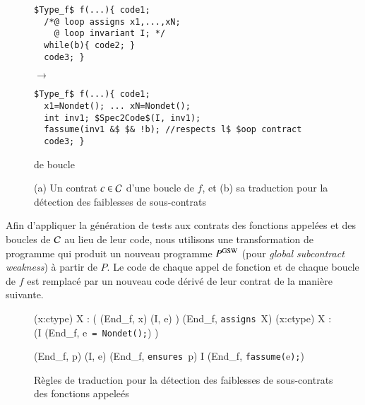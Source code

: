 \begin{figure*}[tb]
\begin{center}
\begin{minipage}{0.35\columnwidth}
\begin{lstlisting}[mathescape]
$Type_f$ f(...){ code1;
  /*@ loop assigns x1,...,xN;
    @ loop invariant I; */
  while(b){ code2; }
  code3; }
\end{lstlisting}
\end{minipage}
\hspace{-6mm}
\begin{minipage}{0.07\columnwidth}$\to$\end{minipage}
\begin{minipage}{0.55\columnwidth}
\begin{lstlisting}[mathescape]
$Type_f$ f(...){ code1;
  x1=Nondet(); ... xN=Nondet();
  int inv1; $Spec2Code$(I, inv1);
  fassume(inv1 &$ $& !b); //respects l$ $oop contract
  code3; }
\end{lstlisting}
\end{minipage}
\vspace{-3mm}
\caption{(a) Un contrat $c\in{\ensuremath\mathcal{C}}$ d'une boucle de $f$, et
(b) sa traduction pour la détection des faiblesses de sous-contrats} de boucle
\vspace{-3mm}
\label{fig:CW-transf-loops}
\end{center}
\end{figure*}

Afin d'appliquer la génération de tests aux contrats des fonctions appelées et
des boucles de ${\mathcal{C}}$ au lieu de leur code, nous utilisons une transformation de
programme qui produit un nouveau programme $P^{\mathrm{GSW}}$ (pour {\em global
subcontract weakness}) à partir de $P$.
Le code de chaque appel de fonction et de chaque boucle de $f$ est remplacé
par un nouveau code dérivé de leur contrat de la manière suivante.

\begin{figure}[tb]
  \scriptsize{
    {
      {
        \forall (x:ctype) \in X :
        (
        (End_f, x) \trule (I, e)
        )
      }
      {
        (End_f, \mbox{\lstinline'assigns'}~X\semicolon) \arule
        \forall (x:ctype) \in X :
        (I \concat (End_f,
        e~\mbox{\lstinline'= Nondet();'}) )
      }{}
    }

    {
      {(End_f, p) \prule (I, e)}
      {(End_f, \mbox{\lstinline'ensures'}~p\semicolon)
        \arule
        I \concat (End_f, \mbox{\lstinline'fassume('}e\mbox{\lstinline');'})}{}
    }
  }
  \caption{Règles de traduction pour la détection des faiblesses de
    sous-contrats des fonctions appeleés}
  \label{fig:assume-annot}
\end{figure}

